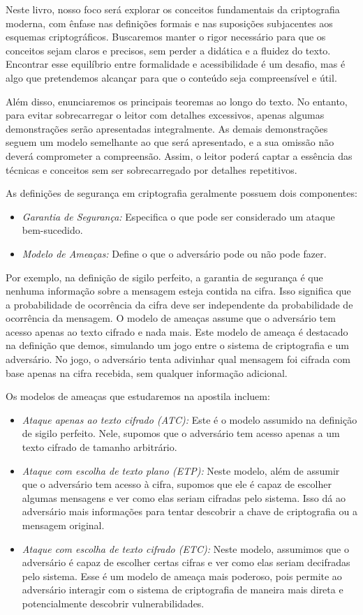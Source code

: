 Neste livro, nosso foco será explorar os conceitos fundamentais da criptografia moderna, com ênfase nas definições formais e nas suposições subjacentes aos esquemas criptográficos.
Buscaremos manter o rigor necessário para que os conceitos sejam claros e precisos, sem perder a didática e a fluidez do texto.
Encontrar esse equilíbrio entre formalidade e acessibilidade é um desafio, mas é algo que pretendemos alcançar para que o conteúdo seja compreensível e útil.

Além disso, enunciaremos os principais teoremas ao longo do texto.
No entanto, para evitar sobrecarregar o leitor com detalhes excessivos, apenas algumas demonstrações serão apresentadas integralmente.
As demais demonstrações seguem um modelo semelhante ao que será apresentado, e a sua omissão não deverá comprometer a compreensão.
Assim, o leitor poderá captar a essência das técnicas e conceitos sem ser sobrecarregado por detalhes repetitivos.

As definições de segurança em criptografia geralmente possuem dois componentes:
\begin{itemize}
\item[] {\em Garantia de Segurança:} Especifica o que pode ser considerado um ataque bem-sucedido.
\item[] {\em Modelo de Ameaças:} Define o que o adversário pode ou não pode fazer.
\end{itemize}

Por exemplo, na definição de sigilo perfeito, a garantia de segurança é que nenhuma informação sobre a mensagem esteja contida na cifra.
Isso significa que a probabilidade de ocorrência da cifra deve ser independente da probabilidade de ocorrência da mensagem.
O modelo de ameaças assume que o adversário tem acesso apenas ao texto cifrado e nada mais.
Este modelo de ameaça é destacado na definição que demos, simulando um jogo entre o sistema de criptografia e um adversário.
No jogo, o adversário tenta adivinhar qual mensagem foi cifrada com base apenas na cifra recebida, sem qualquer informação adicional.

Os modelos de ameaças que estudaremos na apostila incluem:
\begin{itemize}
\item[] {\em Ataque apenas ao texto cifrado (ATC):} 
  Este é o modelo assumido na definição de sigilo perfeito.
  Nele, supomos que o adversário tem acesso apenas a um texto cifrado de tamanho arbitrário.
\item[] {\em Ataque com escolha de texto plano (ETP):}
  Neste modelo, além de assumir que o adversário tem acesso à cifra, supomos que ele é capaz de escolher algumas mensagens e ver como elas seriam cifradas pelo sistema.
  Isso dá ao adversário mais informações para tentar descobrir a chave de criptografia ou a mensagem original.
\item[] {\em Ataque com escolha de texto cifrado (ETC):}
  Neste modelo, assumimos que o adversário é capaz de escolher certas cifras e ver como elas seriam decifradas pelo sistema.
  Esse é um modelo de ameaça mais poderoso, pois permite ao adversário interagir com o sistema de criptografia de maneira mais direta e potencialmente descobrir vulnerabilidades.
\end{itemize}


